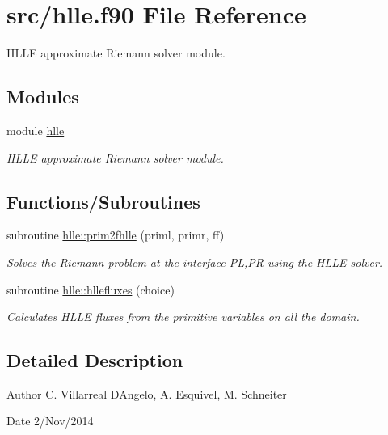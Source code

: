 \hypertarget{hlle_8f90}{}\section{src/hlle.f90 File Reference}
\label{hlle_8f90}


H\+L\+L\+E approximate Riemann solver module.  


\subsection*{Modules}
\begin{DoxyCompactItemize}
\item 
module \hyperlink{namespacehlle}{hlle}
\begin{DoxyCompactList}\small\item\em H\+L\+L\+E approximate Riemann solver module. \end{DoxyCompactList}\end{DoxyCompactItemize}
\subsection*{Functions/\+Subroutines}
\begin{DoxyCompactItemize}
\item 
subroutine \hyperlink{namespacehlle_a5646b0259c574b5e8dd3754a493d358d}{hlle\+::prim2fhlle} (priml, primr, ff)
\begin{DoxyCompactList}\small\item\em Solves the Riemann problem at the interface P\+L,P\+R using the H\+L\+L\+E solver. \end{DoxyCompactList}\item 
subroutine \hyperlink{namespacehlle_a03540214994c25ce07877114dd37b641}{hlle\+::hllefluxes} (choice)
\begin{DoxyCompactList}\small\item\em Calculates H\+L\+L\+E fluxes from the primitive variables on all the domain. \end{DoxyCompactList}\end{DoxyCompactItemize}


\subsection{Detailed Description}
\begin{DoxyAuthor}{Author}
C. Villarreal D\textquotesingle{}Angelo, A. Esquivel, M. Schneiter 
\end{DoxyAuthor}
\begin{DoxyDate}{Date}
2/\+Nov/2014 
\end{DoxyDate}
